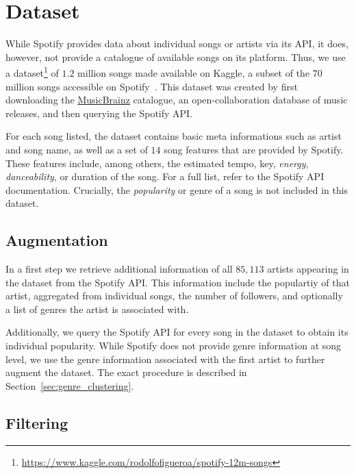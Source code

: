 \documentclass{article}
\begin{document}
\section{Dataset}

While Spotify provides data about individual songs or artists via its API, it does, however, not provide a catalogue of available songs on its platform. Thus, we use a dataset\footnote{\url{https://www.kaggle.com/rodolfofigueroa/spotify-12m-songs}} of $1.2$ million songs made available on Kaggle, a subset of the $70$ million songs accessible on Spotify~\cite{ingham_2020}. This dataset was created by first downloading the \href{https://musicbrainz.org/}{MusicBrainz} catalogue, an open-collaboration database of music releases, and then querying the Spotify API. 

For each song listed, the dataset contains basic meta informations such as artist and song name, as well as a set of $14$ song features that are provided by Spotify. These features include, among others, the estimated tempo, key, \emph{energy}, \emph{danceability}, or duration of the song. For a full list, refer to the Spotify API documentation. Crucially, the \emph{popularity} or genre of a song is not included in this dataset.

\subsection{Augmentation}
In a first step we retrieve additional information of all $85,113$ artists appearing in the dataset from the Spotify API. This information include the populartiy of that artist, aggregated from individual songs, the number of followers, and optionally a list of genres the artist is associated with.

Additionally, we query the Spotify API for every song in the dataset to obtain its individual popularity. While Spotify does not provide genre information at song level, we use the genre information associated with the first artist to further augment the dataset. The exact procedure is described in Section~\ref{sec:genre_clustering}. 

\subsection{Filtering}
\end{document}
